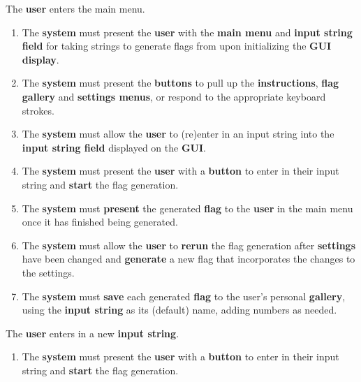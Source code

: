 \documentclass[12pt, titlepage]{article}
\begin{document}
\begin{enumerate}[label=BE\arabic*.]
    \begin{item}
        The \textbf{user} enters the main menu.
        \begin{enumerate}[label=FR\arabic*., series=frs]
            \item The \textbf{system} must present the \textbf{user} with the \textbf{main menu} and \textbf{input string field} for taking strings to generate flags from upon initializing the \textbf{GUI display}.
            
            \item The \textbf{system} must present the \textbf{buttons} to pull up the \textbf{instructions}, \textbf{flag gallery} and \textbf{settings menus}, or respond to the appropriate keyboard strokes.

            \item The \textbf{system} must allow the \textbf{user} to (re)enter in an input string into the \textbf{input string field} displayed on the \textbf{GUI}.

            \item The \textbf{system} must present the \textbf{user} with a \textbf{button} to enter in their input string and \textbf{start} the flag generation.

            \item The \textbf{system} must \textbf{present} the generated \textbf{flag} to the \textbf{user} in the main menu once it has finished being generated.

            \item The \textbf{system} must allow the \textbf{user} to \textbf{rerun} the flag generation after \textbf{settings} have been changed and \textbf{generate} a new flag that incorporates the changes to the settings.

            \item The \textbf{system} must \textbf{save} each generated \textbf{flag} to the user’s personal \textbf{gallery}, using the \textbf{input string} as its (default) name, adding numbers as needed.
        \end{enumerate}
    \end{item}

    \begin{item}
        The \textbf{user} enters in a new \textbf{input string}.
        \begin{enumerate}[label=FR\arabic*., resume*=frs]
            \item The \textbf{system} must present the \textbf{user} with a \textbf{button} to enter in their input string and \textbf{start} the flag generation.
        \end{enumerate}
    \end{item}


\end{enumerate}
\end{document}
